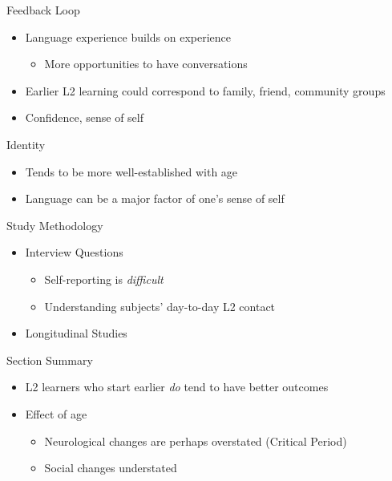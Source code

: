 \documentclass{beamer}
\begin{document}
\begin{frame}{Feedback Loop}
  \begin{itemize}
    \item Language experience builds on experience
    \begin{itemize}
      \item More opportunities to have conversations
    \end{itemize}
    \item Earlier L2 learning could correspond to family, friend, community groups
    \item Confidence, sense of self
  \end{itemize}
\end{frame}

\begin{frame}{Identity}
  \begin{itemize}
    \item Tends to be more well-established with age
    \item Language can be a major factor of one's sense of self
  \end{itemize}
\end{frame}

\begin{frame}{Study Methodology}
    \begin{itemize}
        \item Interview Questions
        \begin{itemize}
          \item Self-reporting is \emph{difficult}
          \item Understanding subjects' day-to-day L2 contact
        \end{itemize}
        \item Longitudinal Studies
    \end{itemize}
\end{frame}

\begin{frame}{Section Summary}
  \begin{itemize}
    \item L2 learners who start earlier \emph{do} tend to have better outcomes
    \item Effect of age
    \begin{itemize}
      \item Neurological changes are perhaps overstated (Critical Period)
      \item Social changes understated
    \end{itemize}
  \end{itemize}
\end{frame}
\end{document}
